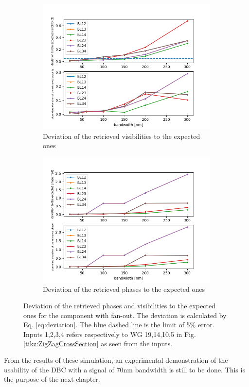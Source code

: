 \begin{figure}[htbp]
    \centering
    \begin{subfigure}{.45\textwidth}
        \includegraphics[scale=.45]{picture/retrieval_simu/visi_retrieved_fan.png}
        \caption{Deviation  of the retrieved visibilities to the expected ones}
    \end{subfigure}%
    \begin{subfigure}{.45\textwidth}
    \includegraphics[scale=.45]{picture/retrieval_simu/phase_retrieved_fan.png}
    \caption{Deviation of the retrieved phases to the expected ones}
    \end{subfigure}
    \caption{Deviation of the retrieved phases and visibilities to the expected ones for the component with fan-out. The deviation is calculated by Eq. \ref{eq:deviation}. The blue dashed line is the limit of 5\% error. Inputs 1,2,3,4 refers respectively to WG 19,14,10,5 in Fig.\ref{tikz:ZigZagCrossSection} as seen from the inputs.}
    \label{fig:retrieved_fan}
\end{figure}

From the results of these simulation, an experimental demonstration of the usability of the DBC with a signal of 70nm bandwidth is still to be done. This is the purpose of the next chapter.
